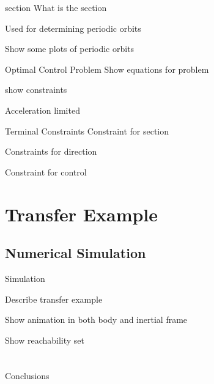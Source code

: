\documentclass[11pt,professionalfonts]{beamer}
\begin{document}
\begin{frame}{\Poincare section}
What is the \Poincare section

Used for determining periodic orbits

Show some plots of periodic orbits
\end{frame}

\begin{frame}{Optimal Control Problem}
Show equations for problem

show constraints

Acceleration limited
\end{frame}

\begin{frame}{Terminal Constraints}
Constraint for section

Constraints for direction

Constraint for control
\end{frame}

\section*{Transfer Example}
\subsection*{Numerical Simulation}

\begin{frame}{Simulation} %

Describe transfer example

Show animation in both body and inertial frame

Show reachability set


\end{frame}%


\section*{}
\subsection*{}

\begin{frame}{Conclusions} %

	

\end{frame}   %
\end{document}

